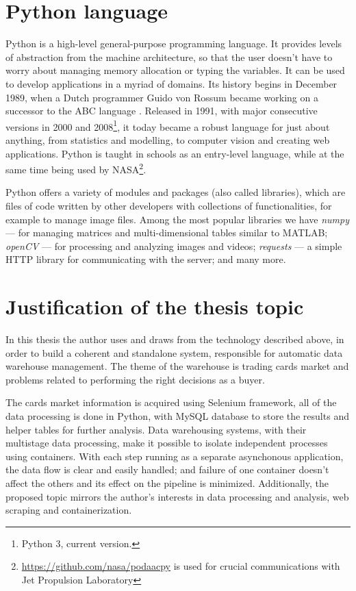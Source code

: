 \section{Python language}
Python is a high-level general-purpose programming language. It provides levels of abstraction from the machine architecture, so that the user doesn't have to worry about managing memory allocation or typing the variables. It can be used to develop applications in a myriad of domains. Its history begins in December 1989, when a Dutch programmer Guido von Rossum became working on a successor to the ABC language \cite{thePython}. Released in 1991, with major consecutive versions in 2000 and 2008\footnote{Python 3, current version.}, it today became a robust language for just about anything, from statistics and modelling, to computer vision and creating web applications. Python is taught in schools as an entry-level language, while at the same time being used by NASA\footnote{\url{https://github.com/nasa/podaacpy} is used for crucial communications with Jet Propulsion Laboratory}. \par
Python offers a variety of modules and packages (also called libraries), which are files of code written by other developers with collections of functionalities, for example to manage image files. Among the most popular libraries we have \textit{numpy} --- for managing matrices and multi-dimensional tables similar to MATLAB; \textit{openCV} --- for processing and analyzing images and videos; \textit{requests} --- a simple HTTP library for communicating with the server; and many more. \par


\section{Justification of the thesis topic}
In this thesis the author uses and draws from the technology described above, in order to build a coherent and standalone system, responsible for automatic data warehouse management. The theme of the warehouse is trading cards market and problems related to performing the right decisions as a buyer. \par
The cards market information is acquired using Selenium framework, all of the data processing is done in Python, with MySQL database to store the results and helper tables for further analysis. Data warehousing systems, with their multistage data processing, make it possible to isolate independent processes using containers. With each step running as a separate asynchonous application, the data flow is clear and easily handled; and failure of one container doesn't affect the others and its effect on the pipeline is minimized. Additionally, the proposed topic mirrors the author's interests in data processing and analysis, web scraping and containerization.


